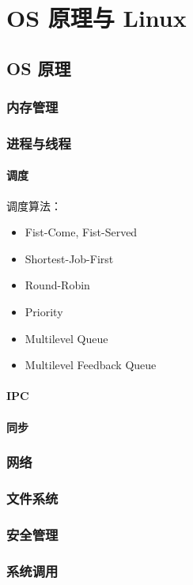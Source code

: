 \chapter{OS 原理与 Linux}

\section{OS 原理}
\subsection{内存管理}
\subsection{进程与线程}
\subsubsection{调度}

调度算法：
\begin{itemize}
  \item Fist-Come, Fist-Served
  \item Shortest-Job-First
  \item Round-Robin
  \item Priority
  \item Multilevel Queue
  \item Multilevel Feedback Queue
\end{itemize}


\subsubsection{IPC}
\subsubsection{同步}
\subsection{网络}
\subsection{文件系统}
\subsection{安全管理}
\subsection{系统调用}

